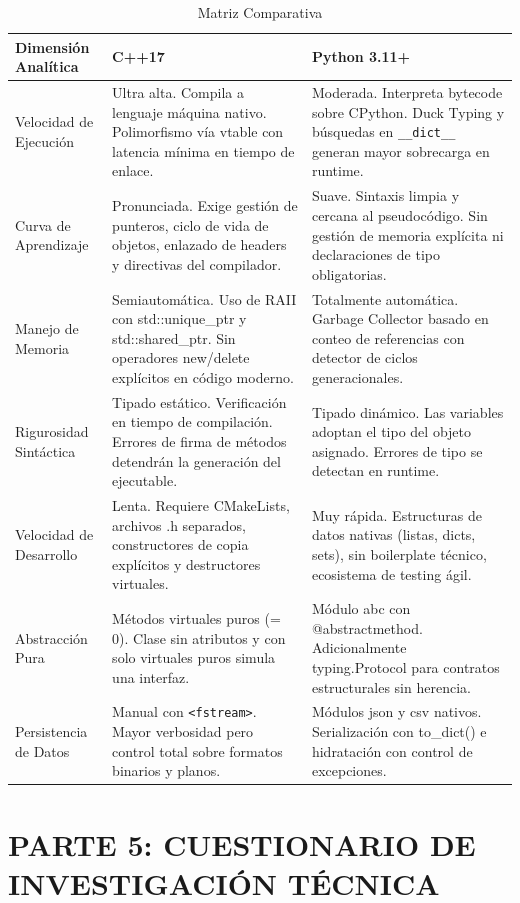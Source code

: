\documentclass[12pt,a4paper]{article}
\begin{document}
\begin{table}[h!]
\centering
\begin{tabularx}{\textwidth}{|l|X|X|}
\hline
\textbf{Dimensión Analítica} & \textbf{C++17} & \textbf{Python 3.11+} \\ \hline
Velocidad de Ejecución & Ultra alta. Compila a lenguaje máquina nativo. Polimorfismo vía vtable con latencia mínima en tiempo de enlace. & Moderada. Interpreta bytecode sobre CPython. Duck Typing y búsquedas en \texttt{\_\_dict\_\_} generan mayor sobrecarga en runtime. \\ \hline
Curva de Aprendizaje & Pronunciada. Exige gestión de punteros, ciclo de vida de objetos, enlazado de headers y directivas del compilador. & Suave. Sintaxis limpia y cercana al pseudocódigo. Sin gestión de memoria explícita ni declaraciones de tipo obligatorias. \\ \hline
Manejo de Memoria & Semiautomática. Uso de RAII con std::unique\_ptr y std::shared\_ptr. Sin operadores new/delete explícitos en código moderno. & Totalmente automática. Garbage Collector basado en conteo de referencias con detector de ciclos generacionales. \\ \hline
Rigurosidad Sintáctica & Tipado estático. Verificación en tiempo de compilación. Errores de firma de métodos detendrán la generación del ejecutable. & Tipado dinámico. Las variables adoptan el tipo del objeto asignado. Errores de tipo se detectan en runtime. \\ \hline
Velocidad de Desarrollo & Lenta. Requiere CMakeLists, archivos .h separados, constructores de copia explícitos y destructores virtuales. & Muy rápida. Estructuras de datos nativas (listas, dicts, sets), sin boilerplate técnico, ecosistema de testing ágil. \\ \hline
Abstracción Pura & Métodos virtuales puros (= 0). Clase sin atributos y con solo virtuales puros simula una interfaz. & Módulo abc con @abstractmethod. Adicionalmente typing.Protocol para contratos estructurales sin herencia. \\ \hline
Persistencia de Datos & Manual con \texttt{<fstream>}. Mayor verbosidad pero control total sobre formatos binarios y planos. & Módulos json y csv nativos. Serialización con to\_dict() e hidratación con control de excepciones. \\ \hline
\end{tabularx}
\caption{Matriz Comparativa}
\end{table}

\section{PARTE 5: CUESTIONARIO DE INVESTIGACIÓN TÉCNICA}
\end{document}
